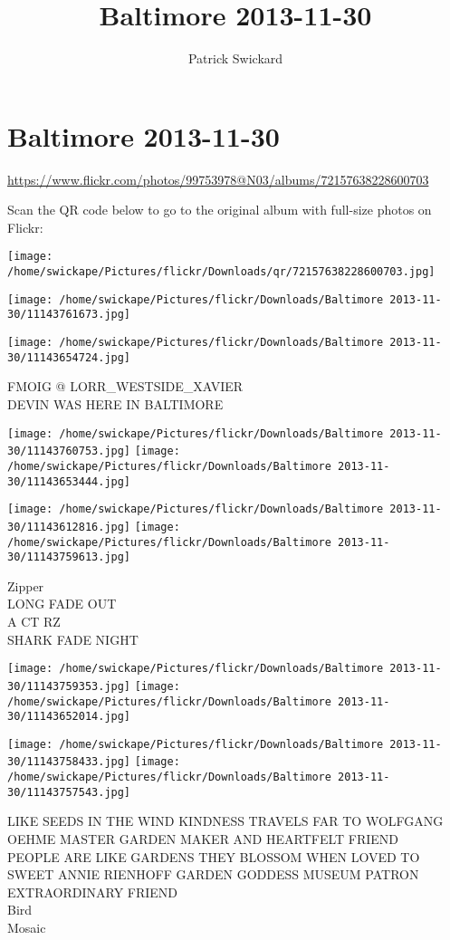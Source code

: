 \documentclass[10pt,letterpaper]{article}
\title{Baltimore 2013-11-30}
\author{Patrick Swickard}
\date{}
\begin{document}
\section*{Baltimore 2013-11-30}

\url{https://www.flickr.com/photos/99753978@N03/albums/72157638228600703}

Scan the QR code below to go to the original album with full-size photos on Flickr:

\texttt{[image: /home/swickape/Pictures/flickr/Downloads/qr/72157638228600703.jpg]}
\pagebreak

\texttt{[image: /home/swickape/Pictures/flickr/Downloads/Baltimore 2013-11-30/11143761673.jpg]}

\vspace{0.25in}
\texttt{[image: /home/swickape/Pictures/flickr/Downloads/Baltimore 2013-11-30/11143654724.jpg]}

FMOIG @ LORR\_WESTSIDE\_XAVIER\\
DEVIN WAS HERE IN BALTIMORE
\pagebreak

\texttt{[image: /home/swickape/Pictures/flickr/Downloads/Baltimore 2013-11-30/11143760753.jpg]}
\texttt{[image: /home/swickape/Pictures/flickr/Downloads/Baltimore 2013-11-30/11143653444.jpg]}

\texttt{[image: /home/swickape/Pictures/flickr/Downloads/Baltimore 2013-11-30/11143612816.jpg]}
\texttt{[image: /home/swickape/Pictures/flickr/Downloads/Baltimore 2013-11-30/11143759613.jpg]}

Zipper\\
LONG FADE OUT\\
A CT RZ\\
SHARK FADE NIGHT
\pagebreak

\texttt{[image: /home/swickape/Pictures/flickr/Downloads/Baltimore 2013-11-30/11143759353.jpg]}
\texttt{[image: /home/swickape/Pictures/flickr/Downloads/Baltimore 2013-11-30/11143652014.jpg]}

\texttt{[image: /home/swickape/Pictures/flickr/Downloads/Baltimore 2013-11-30/11143758433.jpg]}
\texttt{[image: /home/swickape/Pictures/flickr/Downloads/Baltimore 2013-11-30/11143757543.jpg]}

LIKE SEEDS IN THE WIND KINDNESS TRAVELS FAR TO WOLFGANG OEHME MASTER GARDEN MAKER AND HEARTFELT FRIEND\\
PEOPLE ARE LIKE GARDENS THEY BLOSSOM WHEN LOVED TO SWEET ANNIE RIENHOFF GARDEN GODDESS MUSEUM PATRON EXTRAORDINARY FRIEND\\
Bird\\
Mosaic
\pagebreak
\end{document}
